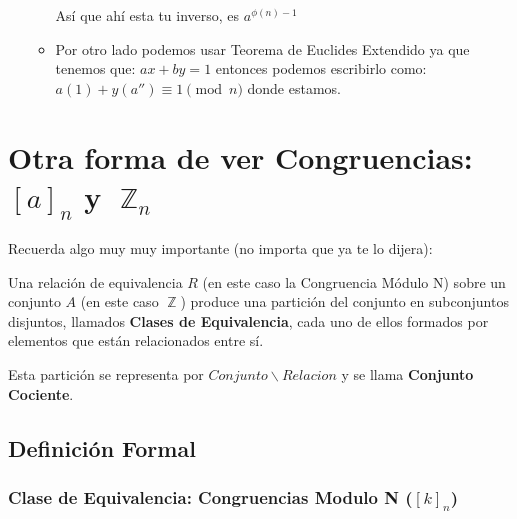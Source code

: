 \documentclass[12pt, fleqn]{report}                             %
\DeclareMathOperator \Integers  {\mathbb{Z}}                     %
\begin{document}
\begin{itemize}
\begin{itemize}
                            Así que ahí esta tu inverso, es $a^{\phi(n)-1}$
                        
                        \item
                            Por otro lado podemos usar Teorema de Euclides Extendido ya que tenemos que:
                            $ax + by = 1$ entonces podemos escribirlo como: $a(1) + y(a'') \equiv 1 \pmod{n}$
                            donde estamos.

                    \end{itemize}



            \end{itemize}




    \clearpage
    \section{Otra forma de ver Congruencias: $[a]_n$ y $\Integers_n$}

        Recuerda algo muy muy importante (no importa que ya te lo dijera):

        Una relación de equivalencia $R$ (en este caso la Congruencia Módulo N)
        sobre un conjunto $A$ (en este caso $\Integers$) produce una partición
        del conjunto en subconjuntos disjuntos, llamados \textbf{Clases de
        Equivalencia}, cada uno de ellos formados por elementos que están
        relacionados entre sí.

        Esta partición se representa por $Conjunto \backslash Relacion$ y se llama
        \textbf{Conjunto Cociente}.


        \subsection*{Definición Formal}

            \subsubsection*{Clase de Equivalencia: Congruencias Modulo N ($[k]_n$)}
\end{document}
